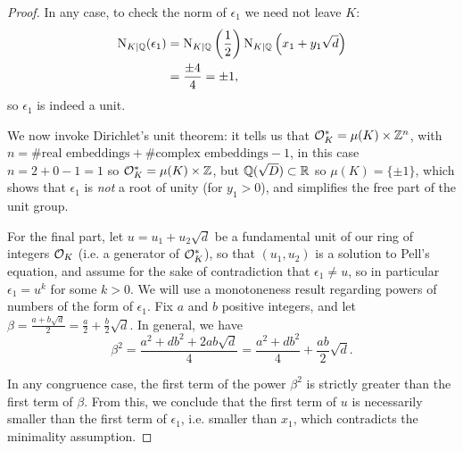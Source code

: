 \begin{proof}
	In any case, to check the norm of $\epsilon_1$ we need not leave $K$:
	\begin{align*}
		\operatorname{N}_{K\mid\mathbb{Q}}(\epsilon_1) &= \operatorname{N}_{K\mid\mathbb{Q}}\left(\frac{1}{2}\right)\operatorname{N}_{K\mid\mathbb{Q}}\left(x_1+y_1\sqrt{d}\right)\\
			&= \frac{\pm 4}{4} = \pm 1,
	\end{align*}
	so $\epsilon_1$ is indeed a unit.

	We now invoke Dirichlet's unit theorem: it tells us that $\mathcal{O}^*_K = \mu(K)\times \mathbb{Z}^n$, with $n=\#\text{real embeddings}+\#\text{complex embeddings}-1$, in this case $n=2+0-1=1$ so $\mathcal{O}^*_K = \mu(K)\times\mathbb{Z}$, but $\mathbb{Q}(\sqrt{D})\subset \mathbb{R}$ so $\mu(K)=\{\pm 1\}$, which shows that $\epsilon_1$ is \emph{not} a root of unity (for $y_1>0$), and simplifies the free part of the unit group.

	For the final part, let $u=u_1+u_2\sqrt{d}$ be a fundamental unit of our ring of integers $\mathcal{O}_K$ (i.e. a generator of $\mathcal{O}^*_K$), so that $(u_1,u_2)$ is a solution to Pell's equation, and assume for the sake of contradiction that $\epsilon_1\neq u$, so in particular $\epsilon_1=u^k$ for some $k>0$. We will use a monotoneness result regarding powers of numbers of the form of $\epsilon_1$. Fix $a$ and $b$ positive integers, and let $\beta = \frac{a+b\sqrt{d}}{2} = \frac{a}{2} + \frac{b}{2}\sqrt{d}$. In general, we have
	\[
		\beta^2 = \frac{a^2+db^2+2ab\sqrt{d}}{4} = \frac{a^2+db^2}{4} + \frac{ab}{2}\sqrt{d}.
	\]

	In any congruence case, the first term of the power $\beta^2$ is strictly greater than the first term of $\beta$. From this, we conclude that the first term of $u$ is necessarily smaller than the first term of $\epsilon_1$, i.e. smaller than $x_1$, which contradicts the minimality assumption.

\end{proof}
